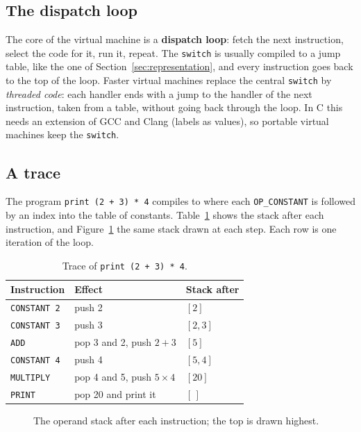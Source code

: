 \subsection{The dispatch loop}

The core of the virtual machine is a \textbf{dispatch loop}: fetch the next
instruction, select the code for it, run it, repeat.
The \texttt{switch} is usually compiled to a jump table, like the one of
Section~\ref{sec:representation}, and every instruction goes back to the top
of the loop. Faster virtual machines replace the central \texttt{switch} by
\emph{threaded code}: each handler ends with a jump to the handler of the next
instruction, taken from a table, without going back through the loop. In C
this needs an extension of GCC and Clang (labels as values), so portable
virtual machines keep the \texttt{switch}.

\subsection{A trace}

The program \texttt{print (2 + 3) * 4} compiles to
where each \texttt{OP\_CONSTANT} is followed by an index into the table of
constants. Table~\ref{tab:vm-trace} shows the stack after each instruction,
and Figure~\ref{fig:vm-stack} the same stack drawn at each step. Each row is
one iteration of the loop.

\begin{table}[h]
\centering
\begin{tabular}{@{}lll@{}}
\toprule
Instruction & Effect & Stack after \\
\midrule
\texttt{CONSTANT 2} & push 2 & $[2]$ \\
\texttt{CONSTANT 3} & push 3 & $[2, 3]$ \\
\texttt{ADD} & pop 3 and 2, push $2 + 3$ & $[5]$ \\
\texttt{CONSTANT 4} & push 4 & $[5, 4]$ \\
\texttt{MULTIPLY} & pop 4 and 5, push $5 \times 4$ & $[20]$ \\
\texttt{PRINT} & pop 20 and print it & $[\,]$ \\
\bottomrule
\end{tabular}
\caption{Trace of \texttt{print (2 + 3) * 4}.}
\label{tab:vm-trace}
\end{table}

\begin{figure}[h]
\centering
{}
\caption{The operand stack after each instruction; the top is drawn highest.}
\label{fig:vm-stack}
\end{figure}


